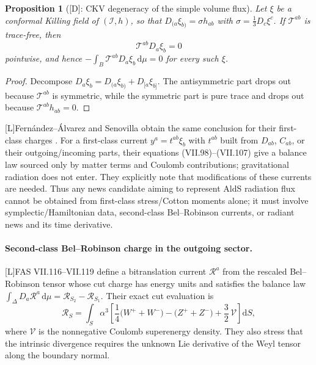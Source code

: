 \documentclass[11pt,a4paper]{article}
\newtheorem{proposition}[theorem]{Proposition}
\newcommand{\scri}{\mathscr{I}}
\newcommand{\cT}{\mathcal{T}}
\newcommand{\cR}{\mathcal{R}}
\newcommand{\cV}{\mathcal{V}}
\newcommand{\diff}{\mathrm{d}}
\newcommand{\statusL}{\textsf{[L]}}
\newcommand{\statusD}{\textsf{[D]}}
\begin{document}
\begin{proposition}[\statusD: CKV degeneracy of the simple volume flux]\label{prop:ckv-degeneracy}
Let \(\xi\) be a conformal Killing field of \((\scri,h)\), so that
\(D_{(a}\xi_{b)}=\sigma h_{ab}\) with \(\sigma=\frac13D_c\xi^c\).  If \(\cT^{ab}\) is trace-free, then
\begin{equation}
  \cT^{ab}D_a\xi_b=0
\end{equation}
pointwise, and hence \(-\int_B\cT^{ab}D_a\xi_b\,\diff\mu=0\) for every such \(\xi\).
\end{proposition}
\begin{proof}
Decompose \(D_a\xi_b=D_{(a}\xi_{b)}+D_{[a}\xi_{b]}\).  The antisymmetric part drops out because \(\cT^{ab}\) is symmetric, while the symmetric part is pure trace and drops out because \(\cT^{ab}h_{ab}=0\).
\end{proof}

\statusL Fernández--Álvarez and Senovilla obtain the same conclusion for their first-class charges \cite{fabSen2022asymptotic}.  For a first-class current \(y^a=t^{ab}\xi_b\) with \(t^{ab}\) built from \(D_{ab}\), \(C_{ab}\), or their outgoing/incoming parts, their equations (VII.98)--(VII.107) give a balance law sourced only by matter terms and Coulomb contributions; gravitational radiation does not enter.  They explicitly note that modifications of these currents are needed.  Thus any news candidate aiming to represent AldS radiation flux cannot be obtained from first-class stress/Cotton moments alone; it must involve symplectic/Hamiltonian data, second-class Bel--Robinson currents, or radiant news and its time derivative.

\paragraph{Second-class Bel--Robinson charge in the outgoing sector.}
\statusL FAS VII.116--VII.119 define a bitranslation current \(\cR^a\) from the rescaled Bel--Robinson tensor whose cut charge has energy units and satisfies the balance law \(\int_\Delta D_a\cR^a\,\diff\mu=\cR_{S_2}-\cR_{S_1}\).  Their exact cut evaluation is
\begin{equation}\label{eq:BR-second-class-charge}
  \cR_S
  =
  \int_S
  \alpha^3
  \left[
  \frac14\big(W^++W^-\big)
  -
  \big(Z^++Z^-\big)
  +\frac32\,\cV
  \right]\diff S ,
\end{equation}
where \(\cV\) is the nonnegative Coulomb superenergy density.  They also stress that the intrinsic divergence requires the unknown Lie derivative of the Weyl tensor along the boundary normal.
\end{document}
